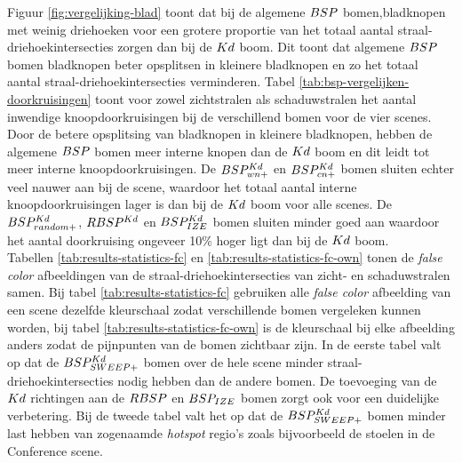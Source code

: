 Figuur \ref{fig:vergelijking-blad} toont dat bij de algemene $BSP$ bomen,bladknopen met weinig driehoeken voor een grotere proportie van het totaal aantal straal-driehoekintersecties zorgen dan bij de $Kd$ boom. Dit toont dat algemene $BSP$ bomen bladknopen beter opsplitsen in kleinere bladknopen en zo het totaal aantal straal-driehoekintersecties verminderen. Tabel \ref{tab:bsp-vergelijken-doorkruisingen} toont voor zowel zichtstralen als schaduwstralen het aantal inwendige knoopdoorkruisingen bij de verschillend bomen voor de vier scenes.
Door de betere opsplitsing van bladknopen in kleinere bladknopen, hebben de algemene $BSP$ bomen meer interne knopen dan de $Kd$ boom en dit leidt tot meer interne knoopdoorkruisingen. 
De $BSP^{Kd}_{wn+}$ en $BSP^{Kd}_{cn+}$ bomen sluiten echter veel nauwer aan bij de scene, waardoor het totaal aantal interne knoopdoorkruisingen lager is dan bij de $Kd$ boom voor alle scenes.
De $BSP^{Kd}_{random+}$, $RBSP^{Kd}$ en $BSP^{Kd}_{IZE}$ bomen sluiten minder goed aan waardoor het aantal doorkruising ongeveer 10\% hoger ligt dan bij de $Kd$ boom.\\

Tabellen \ref{tab:results-statistics-fc} en \ref{tab:results-statistics-fc-own} tonen de \textit{false color} afbeeldingen van de straal-driehoekintersecties van zicht- en schaduwstralen samen.
Bij tabel \ref{tab:results-statistics-fc} gebruiken alle \textit{false color} afbeelding van een scene dezelfde kleurschaal zodat verschillende bomen vergeleken kunnen worden, bij tabel \ref{tab:results-statistics-fc-own} is de kleurschaal bij elke afbeelding anders zodat de pijnpunten van de bomen zichtbaar zijn.
In de eerste tabel valt op dat de $BSP^{Kd}_{SWEEP+}$ bomen over de hele scene minder straal-driehoekintersecties nodig hebben dan de andere bomen. De toevoeging van de $Kd$ richtingen aan de $RBSP$ en $BSP_{IZE}$ bomen zorgt ook voor een duidelijke verbetering. Bij de tweede tabel valt het op dat de $BSP^{Kd}_{SWEEP+}$ bomen minder last hebben van zogenaamde \textit{hotspot} regio's zoals bijvoorbeeld de stoelen in de Conference scene.
\\

